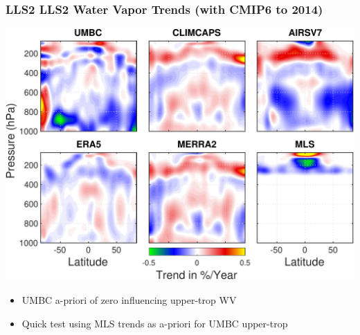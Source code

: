 \documentclass[10pt,t]{beamer}
\begin{document}
\begin{frame}
\frametitle{LLS2 LLS2 Water Vapor Trends (with CMIP6 to 2014)}  
\vspace{-0.15in}
\begin{center}
\includegraphics[width=\textwidth]{Figslls/tiled_all_N_RH_trend_withmls_start.pdf}
\end{center}

\small
\begin{itemize}
\item UMBC a-priori of zero influencing upper-trop WV
\item Quick test using MLS trends as a-priori for UMBC upper-trop
\end{itemize}
\end{frame}
\end{document}
